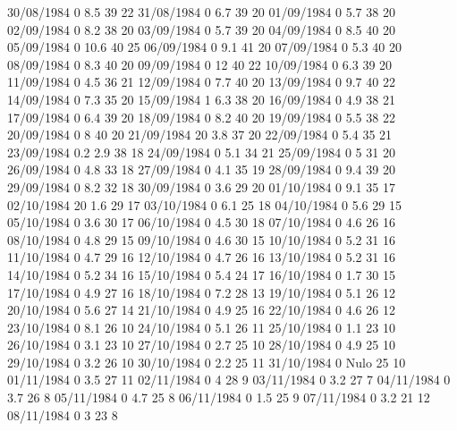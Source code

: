 30/08/1984  0      8.5    39     22 
31/08/1984  0      6.7    39     20 
01/09/1984  0      5.7    38     20 
02/09/1984  0      8.2    38     20 
03/09/1984  0      5.7    39     20 
04/09/1984  0      8.5    40     20 
05/09/1984  0      10.6   40     25 
06/09/1984  0      9.1    41     20 
07/09/1984  0      5.3    40     20 
08/09/1984  0      8.3    40     20 
09/09/1984  0      12     40     22 
10/09/1984  0      6.3    39     20 
11/09/1984  0      4.5    36     21 
12/09/1984  0      7.7    40     20 
13/09/1984  0      9.7    40     22 
14/09/1984  0      7.3    35     20 
15/09/1984  1      6.3    38     20 
16/09/1984  0      4.9    38     21 
17/09/1984  0      6.4    39     20 
18/09/1984  0      8.2    40     20 
19/09/1984  0      5.5    38     22 
20/09/1984  0      8      40     20 
21/09/1984  20     3.8    37     20 
22/09/1984  0      5.4    35     21 
23/09/1984  0.2    2.9    38     18 
24/09/1984  0      5.1    34     21 
25/09/1984  0      5      31     20 
26/09/1984  0      4.8    33     18 
27/09/1984  0      4.1    35     19 
28/09/1984  0      9.4    39     20 
29/09/1984  0      8.2    32     18 
30/09/1984  0      3.6    29     20 
01/10/1984  0      9.1    35     17 
02/10/1984  20     1.6    29     17 
03/10/1984  0      6.1    25     18 
04/10/1984  0      5.6    29     15 
05/10/1984  0      3.6    30     17 
06/10/1984  0      4.5    30     18 
07/10/1984  0      4.6    26     16 
08/10/1984  0      4.8    29     15 
09/10/1984  0      4.6    30     15 
10/10/1984  0      5.2    31     16 
11/10/1984  0      4.7    29     16 
12/10/1984  0      4.7    26     16 
13/10/1984  0      5.2    31     16 
14/10/1984  0      5.2    34     16 
15/10/1984  0      5.4    24     17 
16/10/1984  0      1.7    30     15 
17/10/1984  0      4.9    27     16 
18/10/1984  0      7.2    28     13 
19/10/1984  0      5.1    26     12 
20/10/1984  0      5.6    27     14 
21/10/1984  0      4.9    25     16 
22/10/1984  0      4.6    26     12 
23/10/1984  0      8.1    26     10 
24/10/1984  0      5.1    26     11 
25/10/1984  0      1.1    23     10 
26/10/1984  0      3.1    23     10 
27/10/1984  0      2.7    25     10 
28/10/1984  0      4.9    25     10 
29/10/1984  0      3.2    26     10 
30/10/1984  0      2.2    25     11 
31/10/1984  0     Nulo    25     10 
01/11/1984  0      3.5    27     11 
02/11/1984  0      4      28     9 
03/11/1984  0      3.2    27     7 
04/11/1984  0      3.7    26     8 
05/11/1984  0      4.7    25     8 
06/11/1984  0      1.5    25     9 
07/11/1984  0      3.2    21     12 
08/11/1984  0      3      23     8 
